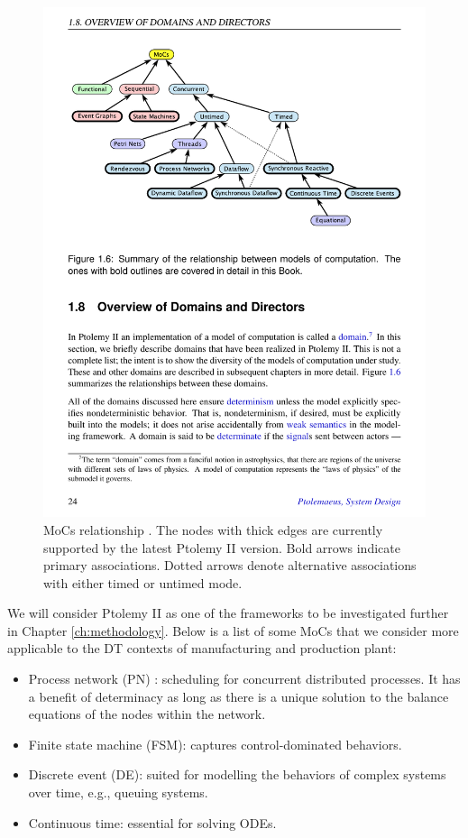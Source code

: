 \begin{figure}[htb!]
  \centering
  \includegraphics[scale=0.8]{figures/moc.pdf}
  \caption[MoCs relationship]{MoCs relationship \cite{Ptolemaeus2014}. The nodes with thick edges are currently supported by the latest Ptolemy II version. Bold arrows indicate primary associations. Dotted arrows denote alternative associations with either timed or untimed mode.}
  \label{fig:moc}
\end{figure}

We will consider Ptolemy II as one of the frameworks to be investigated further in Chapter \ref{ch:methodology}. Below is a list of some MoCs that we consider more applicable to the DT contexts of manufacturing and production plant:

\begin{itemize}

  \item Process network (PN) \cite{Tripakis2014} : scheduling for concurrent distributed processes. It has a benefit of determinacy as long as there is a unique solution to the balance equations of the nodes within the network. 

  \item Finite state machine (FSM): captures control-dominated behaviors. 
  
  \item Discrete event (DE): suited for modelling the behaviors of complex systems over time, e.g., queuing systems.
  
  \item Continuous time: essential for solving ODEs.

\end{itemize}

